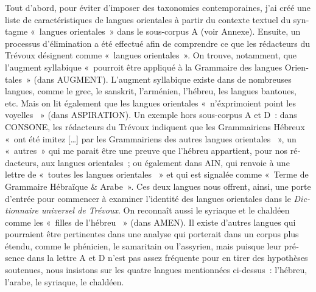 \documentclass[output=paper,colorlinks,citecolor=brown,arabicfont,chinesefont,booklanguage=french]{langscibook}
\begin{document}
\begin{otherlanguage}{french}
Tout d’abord, pour éviter d’imposer des taxonomies contemporaines, j’ai créé une liste de caractéristiques de langues orientales à partir du contexte textuel du syntagme «~langues orientales~» dans le sous-corpus A (voir Annexe). Ensuite, un processus d'élimination a été effectué afin de comprendre ce que les rédacteurs du Trévoux désignent comme «~langues orientales~». On trouve, notamment, que l’augment syllabique «~pourroit être appliqué à la Grammaire des langues Orientales~» (dans AUGMENT). L’augment syllabique existe dans de nombreuses langues, comme le grec, le sanskrit, l'arménien, l'hébreu, les langues bantoues, etc. Mais on lit également que les langues orientales «~n’éxprimoient point les voyelles ~» (dans ASPIRATION). Un exemple hors sous-corpus A et D~: dans CONSONE, les rédacteurs du Trévoux indiquent que les Grammairiens Hébreux «~ont été imitez […] par les Grammairiens des autres langues orientales ~», un «~autres~» qui me parait être une preuve que l’hébreu appartient, pour nos rédacteurs, aux langues orientales~; ou également dans AIN, qui renvoie à une lettre de «~toutes les langues orientales ~» et qui est signalée comme «~Terme de Grammaire Hébraïque \& Arabe~». Ces deux langues nous offrent, ainsi, une porte d’entrée pour commencer à examiner l’identité des langues orientales dans le \emph{Dictionnaire universel de Trévoux}. On reconnaît aussi le syriaque et le chaldéen comme les «~filles de l’hébreu ~» (dans AMEN). Il existe d’autres langues qui pourraient être pertinentes dans une analyse qui porterait dans un corpus plus étendu, comme le phénicien, le samaritain ou l’assyrien, mais puisque leur présence dans la lettre A et D n’est pas assez fréquente pour en tirer des hypothèses soutenues, nous insistons sur les quatre langues mentionnées ci-dessus~: l’hébreu, l’arabe, le syriaque, le chaldéen. 


\end{otherlanguage}
\end{document}
